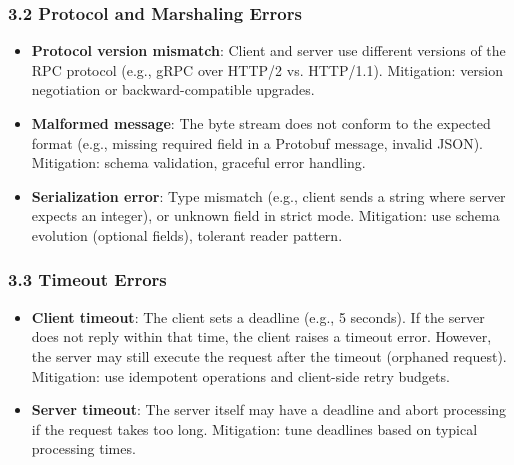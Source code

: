 \documentclass[10pt,a4paper]{article}
\begin{document}
\subsubsection{3.2 Protocol and Marshaling Errors}
\begin{itemize}
    \item \textbf{Protocol version mismatch}: Client and server use different versions of the RPC protocol (e.g., gRPC over HTTP/2 vs. HTTP/1.1). Mitigation: version negotiation or backward-compatible upgrades.
    \item \textbf{Malformed message}: The byte stream does not conform to the expected format (e.g., missing required field in a Protobuf message, invalid JSON). Mitigation: schema validation, graceful error handling.
    \item \textbf{Serialization error}: Type mismatch (e.g., client sends a string where server expects an integer), or unknown field in strict mode. Mitigation: use schema evolution (optional fields), tolerant reader pattern.
\end{itemize}

\subsubsection{3.3 Timeout Errors}
\begin{itemize}
    \item \textbf{Client timeout}: The client sets a deadline (e.g., 5 seconds). If the server does not reply within that time, the client raises a timeout error. However, the server may still execute the request after the timeout (orphaned request). Mitigation: use idempotent operations and client-side retry budgets.
    \item \textbf{Server timeout}: The server itself may have a deadline and abort processing if the request takes too long. Mitigation: tune deadlines based on typical processing times.
\end{itemize}
\end{document}
